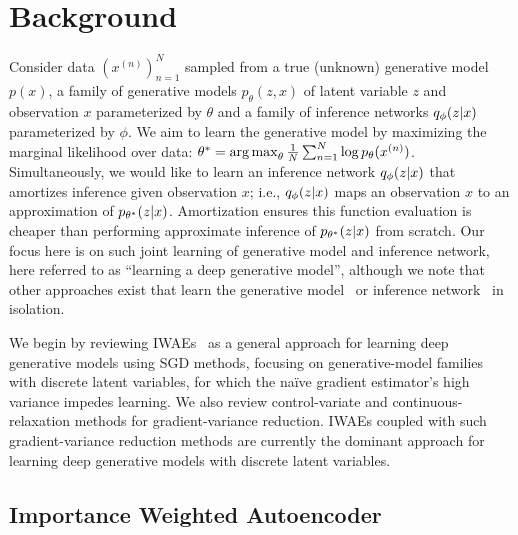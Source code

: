 
\section{Background}
\vspace*{-1ex}
\label{sec:background}

Consider data $(x^{(n)})_{n = 1}^N$ sampled from a true (unknown) generative model $p(x)$, a family of generative models $p_\theta(z, x)$ of latent variable $z$ and observation $x$ parameterized by $\theta$ and a family of inference networks $q_\phi(z \lvert x)$ parameterized by $\phi$.
We aim to learn the generative model by maximizing the marginal likelihood over data: \(\theta^* = \operatorname*{arg\,max}_\theta  \frac{1}{N} \sum_{n = 1}^N  \log p_\theta(x^{(n)})\).
Simultaneously, we would like to learn an inference network $q_\phi(z \lvert x)$ that amortizes inference given observation $x$; i.e., $q_\phi(z \lvert x)$ maps an observation $x$ to an approximation of $p_{\theta^*}(z \lvert x)$.
Amortization ensures this function evaluation is cheaper than performing approximate inference of $p_{\theta^*}(z \lvert x)$ from scratch.
Our focus here is on such joint learning of generative model and inference network, here referred to as ``learning a deep generative model'', although we note that other approaches exist that learn the generative model~\citep{goodfellow2014generative,mohamed2016learning} or inference network~\citep{paige2016inference,le2017inference} in isolation.

We begin by reviewing \glspl{IWAE}~\citep{burda2016importance} as a general approach for learning deep generative models using \gls{SGD} methods, focusing on generative-model families with discrete latent variables, for which the na\"ive gradient estimator's high variance impedes learning.
We also review control-variate and continuous-relaxation methods for gradient-variance reduction.
\Glspl{IWAE} coupled with such gradient-variance reduction methods are currently the dominant approach for learning deep generative models with discrete latent variables.

\subsection{Importance Weighted Autoencoder}

